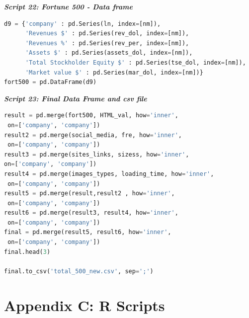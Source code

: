 \documentclass{book}
\begin{document}
\begin{center}
\textit{\textbf{Script 22: Fortune 500 - Data frame}} \label{p22}
\end{center}
\begin{lstlisting}[language=Python]  
d9 = {'company' : pd.Series(ln, index=[nm]),
      'Revenues $' : pd.Series(rev_dol, index=[nm]),
      'Revenues %' : pd.Series(rev_per, index=[nm]),
      'Assets $' : pd.Series(assets_dol, index=[nm]),
      'Total Stockholder Equity $' : pd.Series(tse_dol, index=[nm]),
      'Market value $' : pd.Series(mar_dol, index=[nm])}
fort500 = pd.DataFrame(d9)    
\end{lstlisting}

\begin{center}
\textit{\textbf{Script 23: Final Data Frame and csv file}}\label{p23}
\end{center}
\begin{lstlisting}[language=Python]
result = pd.merge(fort500, HTML_val, how='inner',
 on=['company', 'company'])
result2 = pd.merge(social_media, fre, how='inner',
 on=['company', 'company'])
result3 = pd.merge(sites_links, sizess, how='inner', 
on=['company', 'company'])
result4 = pd.merge(images_types, loading_time, how='inner',
 on=['company', 'company'])
result5 = pd.merge(result,result2 , how='inner',
 on=['company', 'company'])
result6 = pd.merge(result3, result4, how='inner',
 on=['company', 'company'])
final = pd.merge(result5, result6, how='inner',
 on=['company', 'company'])
final.head(3)

final.to_csv('total_500_new.csv', sep=';')
\end{lstlisting}

\newpage
\section{Appendix C: R Scripts} \label{appR}
\end{document}
